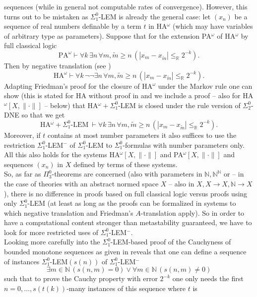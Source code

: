 \documentclass[1p]{elsarticle}
\newcommand{\RR}{\ensuremath{\mathbb{R}}}
\newcommand{\NN}{\ensuremath{\mathbb{N}}}
\theoremstyle{plain}
\theoremstyle{definition}
\theoremstyle{remark}
\theoremstyle{definition}
\begin{document}
sequences (while in general not computable rates of convergence). 
However, this 
turns out to be mistaken as $\Sigma^0_1$-LEM is already the general case: 
let $(x_n)$ be a sequence of real numbers definable by a term $t$ 
in HA$^{\omega}$ 
(which may have variables of arbitrary type as parameters). Suppose that 
for the extension PA$^{\omega}$ of HA$^{\omega}$ by full classical logic 
\[ \mbox{PA}^{\omega}\vdash \forall k\,\exists n\,\forall m,\tilde{m}\ge n\,
(|x_m-x_{\tilde{m}}|\le_{\RR} 2^{-k}). \]
Then by negative translation (see \cite{Kohlenbach(book)}) 
\[ \mbox{HA}^{\omega}\vdash  \forall k\,\neg\neg 
\exists n\,\forall m,\tilde{m}\ge n\,
(|x_m-x_{\tilde{m}}|\le_{\RR} 2^{-k}). \]
Adapting Friedman's proof for the closure of HA$^{\omega}$ under the Markov 
rule one can show (this is stated for HA without proof in 
\cite{Hayashi/Nakata} and we include a proof -- also for 
HA$^{\omega}[X,\|\cdot\|]$ -- below) that HA$^{\omega}+
\Sigma^0_1$-LEM  
is closed under the rule version of $\Sigma^0_2$-DNE so that we get 
\[ \mbox{HA$^{\omega}+\Sigma^0_1$-LEM} \ 
\vdash \forall k\,\exists n\,\forall m,\tilde{m}\ge n\,
(|x_m-x_{\tilde{m}}|\le_{\RR} 2^{-k}). \] 
Moreover, if $t$ contains at most number parameters it also suffices to 
use the restriction $\Sigma^0_1$-LEM$^-$ of $\Sigma^0_1$-LEM to 
$\Sigma^0_1$-formulas with number parameters only. All this also holds for 
the systems HA$^{\omega}[X,\|\cdot\|]$ and PA$^{\omega}[X,\|\cdot\|]$ 
and sequences $(x_n)$ in $X$ defined by terms of these systems.
\\[2mm] 
So, as far as $\Pi^0_3$-theorems are concerned 
(also with parameters in $\NN,\NN^{\NN}$ 
or -- in the case of theories with an abstract normed space $X$ -- 
also in $X,X\to X, \NN\to X$), there is no difference in proofs based 
on full classical logic versus proofs using only $\Sigma^0_1$-LEM 
(at least as long as the proofs can be formalized in systems to which 
negative translation and Friedman's $A$-translation apply). So in 
order to have a computational content stronger than metastability 
guaranteed, we have to look for more restricted uses of $\Sigma^0_1$-LEM$^-.$  
\\  
Looking more carefully into the $\Sigma^0_1$-LEM-based proof of the 
Cauchyness of bounded monotone sequences as given in \cite{Toftdal} reveals 
that one can define a sequence of instances $\Sigma^0_1$-LEM$(s(n))$ 
of $\Sigma^0_1$-LEM$^-$ 
\[ \exists m\in\NN \,(s(n,m)=0)\vee \forall m\in\NN\,(s(n,m)\not= 0) \] 
such that to prove the Cauchy property with error $2^{-k}$ one only needs 
the first $n=0,\ldots,s(t(k))$-many instances of this sequence where $t$ is 
\end{document}
